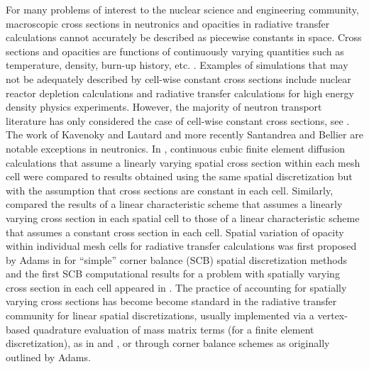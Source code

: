 For many problems of interest to the nuclear science and engineering community, macroscopic cross sections in neutronics and opacities in radiative transfer calculations cannot accurately be described as piecewise constants in space.  
Cross sections and opacities are functions of continuously varying quantities such as temperature, density, burn-up history, etc. \cite{xs_are_T_dependent}.
Examples of simulations that may not be adequately described by cell-wise constant cross sections include nuclear reactor depletion calculations and radiative transfer calculations for high energy density physics experiments.    
However, the majority of neutron transport literature has only considered the case of cell-wise constant cross sections, see \cite{adams, lewis_book, warsa_krylov, ragusa_ane}. 
The work of Kavenoky and Lautard \cite{varXS_diff} and more recently Santandrea and Bellier \cite{varXS_MOC} are notable exceptions in neutronics. 
In \cite{varXS_diff}, continuous cubic finite element diffusion calculations that assume a linearly varying spatial cross section within each mesh cell were compared to results obtained using the same spatial discretization but with the assumption that cross sections are constant in each cell.
Similarly, \cite{varXS_MOC} compared the results of a linear characteristic scheme that assumes a linearly varying cross section in each spatial cell 
to those of a linear characteristic scheme that assumes a constant cross section in each cell.
Spatial variation of opacity within individual mesh cells for radiative transfer calculations was first proposed by Adams in \cite{adams_scb} for ``simple'' corner balance (SCB) spatial discretization methods and the first SCB computational results for a problem with spatially varying cross section in each cell appeared in \cite{adams_nowak}.  
The practice of accounting for spatially varying cross sections has become become standard in the radiative transfer community for linear spatial discretizations, usually  implemented via a vertex-based quadrature evaluation of mass matrix terms (for a finite element discretization), as in \cite{ober_shadid} and \cite{warsa_lmfga}, or through corner balance schemes as originally outlined by Adams.

